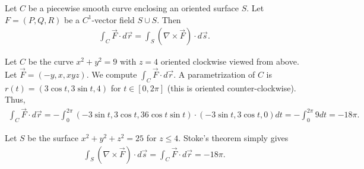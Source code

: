 \begin{theorem}
    Let $C$ be a piecewise smooth curve enclosing an oriented surface $S$. Let $F = (P,Q,R)$ be a $C^{1}$-vector field $S \cup S$. Then
    \begin{align}
        \int_{C} \vec{F} \cdot d\vec{r} = \int_{S} (\nabla \times \vec{F}) \cdot d\vec{s}.
    \end{align}
\end{theorem}

\begin{example}
    Let $C$ be the curve $x^{2}+y^{2} = 9$ with $z = 4$ oriented clockwise viewed from above. Let $\vec{F} = (-y,x,xyz)$. We compute $\int_{C} \vec{F} \cdot d\vec{r}$. A parametrization of $C$ is $r(t) = (3\cos t, 3\sin t, 4)$ for $t \in [0,2\pi]$ (this is oriented counter-clockwise). Thus,
    \begin{align}
        \int_{C} \vec{F} \cdot d\vec{r} = -\int_{0}^{2\pi} (-3\sin t, 3\cos t, 36 \cos t \sin t) \cdot (-3\sin t, 3\cos t, 0) dt = -\int_{0}^{2\pi} 9 dt = -18\pi.
    \end{align}

    Let $S$ be the surface $x^{2} + y^{2} + z^{2} = 25$ for $z \leq 4$. Stoke's theorem simply gives
    \begin{align}
        \int_{S} (\nabla \times \vec{F}) \cdot d\vec{s} = \int_{C} \vec{F} \cdot d\vec{r} = -18\pi.
    \end{align}
\end{example}